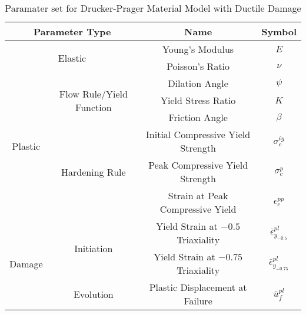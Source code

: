 \begin{table}[]
\centering
\caption{Paramater set for Drucker-Prager Material Model with Ductile Damage}
\label{tab:1}
\begin{tabular}{@{}cccc@{}}
\toprule
\multicolumn{2}{c}{\textbf{Parameter Type}}                                                                      & \textbf{Name}                              & \textbf{Symbol}                   \\ \midrule
\multicolumn{2}{c}{\multirow{2}{*}{Elastic}}                                                                     & Young's Modulus                            & $E$                               \\
\multicolumn{2}{c}{}                                                                                             & Poisson's Ratio                            & $\nu$                             \\ \cmidrule{1-2}
\multirow{6}{*}{Plastic} & \multirow{3}{*}{Flow Rule/Yield Function} & Dilation Angle                             & $\psi$                            \\
                         &                                                                                       & Yield Stress Ratio                         & $K$                               \\
                         &                                                                                       & Friction Angle                             & $\beta$                           \\ \cmidrule{2-2}
                         & \multirow{3}{*}{Hardening Rule}                                                       & Initial Compressive Yield Strength         & $\sigma_c^{iy}$                   \\
                         &                                                                                       & Peak Compressive Yield Strength & $\sigma_c^{p}$                    \\
                         &                                                                                       & Strain at Peak Compressive Yield           & $\epsilon_c^{pp}$                 \\ \cmidrule{1-2}
\multirow{3}{*}{Damage}  & \multirow{2}{*}{Initiation}                                                           & Yield Strain at $-0.5$ Triaxiality         & $\bar{\epsilon}^{pl}_{y_{-0.5}}$  \\
                         &                                                                                       & Yield Strain at $-0.75$ Triaxiality        & $\bar{\epsilon}^{pl}_{y_{-0.75}}$ \\ \cmidrule{2-2}
                         & Evolution                                                                             & Plastic Displacement at Failure            & $\bar{u}^{pl}_f$                  \\ \bottomrule
\end{tabular}
\end{table}

